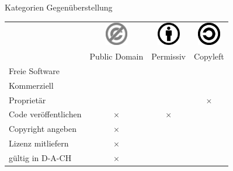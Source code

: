 \begin{frame}{Kategorien Gegenüberstellung}
	\newcommand{\yes}{\color{green}\checkmark}
	\newcommand{\no}{\boldmath \color{red}$\times$}
	\begin{tabular}{lccc}
		& \includegraphics[width=1cm]{res/PD-icon.pdf} & \includegraphics[width=1cm]{res/by.pdf} & \includegraphics[width=1cm]{res/copyleft.pdf} \\ 
		& Public Domain & Permissiv & Copyleft \\ 
		\hline 
		\pause
		Freie Software & \yes & \yes & \yes \\ 
		\hline 
		\pause
		Kommerziell & \yes & \yes & \yes \\ 
		\hline 
		\pause
		Proprietär & \yes & \yes & \no \\ 
		\hline 
		\pause
		Code veröffentlichen & \no & \no & \yes \\ 
		\hline 
		\pause
		Copyright angeben & \no & \yes & \yes \\ 
		\hline 
		\pause
		Lizenz mitliefern & \no & \yes & \yes \\ 
		\hline 
		\pause
		gültig in D-A-CH & \no & \yes & \yes \\
		\hline 
	\end{tabular} 
\end{frame}{

}
